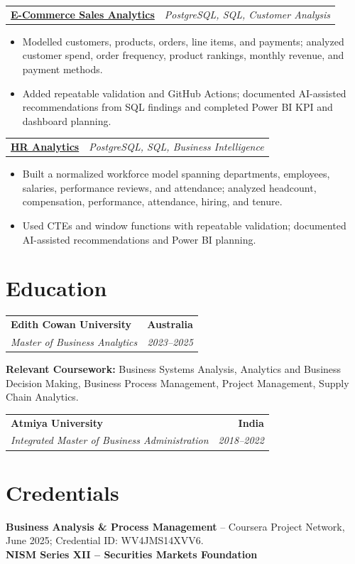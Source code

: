 \documentclass[letterpaper,10pt]{article}
\makeatletter
\newcommand{\role}[4]{%
  \begin{tabularx}{\textwidth}{@{}Xr@{}}
    \textbf{#1} & \textbf{#2} \\
    \textit{#3} & \textit{#4}
  \end{tabularx}\vspace{-1pt}
}
\newcommand{\project}[2]{%
  \begin{tabularx}{\textwidth}{@{}Xr@{}}
    \textbf{#1} & \textit{#2}
  \end{tabularx}\vspace{-1pt}
}
\makeatother
\begin{document}
\project{\href{https://github.com/jainalimehta/Ecommerce-Sales-Analytics}{E-Commerce Sales Analytics}}{PostgreSQL, SQL, Customer Analysis}
\begin{itemize}
  \item Modelled customers, products, orders, line items, and payments; analyzed customer spend, order frequency, product rankings, monthly revenue, and payment methods.
  \item Added repeatable validation and GitHub Actions; documented AI-assisted recommendations from SQL findings and completed Power BI KPI and dashboard planning.
\end{itemize}
\vspace{1pt}

\project{\href{https://github.com/jainalimehta/HR-Analytics}{HR Analytics}}{PostgreSQL, SQL, Business Intelligence}
\begin{itemize}
  \item Built a normalized workforce model spanning departments, employees, salaries, performance reviews, and attendance; analyzed headcount, compensation, performance, attendance, hiring, and tenure.
  \item Used CTEs and window functions with repeatable validation; documented AI-assisted recommendations and Power BI planning.
\end{itemize}

\section{Education}
\role{Edith Cowan University}{Australia}{Master of Business Analytics}{2023--2025}
\small\textbf{Relevant Coursework:} Business Systems Analysis, Analytics and Business Decision Making, Business Process Management, Project Management, Supply Chain Analytics.\\[2pt]
\role{Atmiya University}{India}{Integrated Master of Business Administration}{2018--2022}

\section{Credentials}
\small\textbf{Business Analysis \& Process Management} -- Coursera Project Network, June 2025; Credential ID: WV4JMS14XVV6.\\[-0.2pt]
\small\textbf{NISM Series XII -- Securities Markets Foundation}
\end{document}
